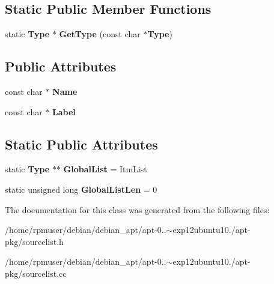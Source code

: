 \subsection*{\-Static \-Public \-Member \-Functions}
\begin{DoxyCompactItemize}
\item 
static {\bf \-Type} $\ast$ {\bfseries \-Get\-Type} (const char $\ast${\bf \-Type})\label{classpkgSourceList_1_1Type_a585f51a9eee88b69baeecffd95d4d71d}

\end{DoxyCompactItemize}
\subsection*{\-Public \-Attributes}
\begin{DoxyCompactItemize}
\item 
const char $\ast$ {\bfseries \-Name}\label{classpkgSourceList_1_1Type_a760b4e07b204e4852e7fb55e25567623}

\item 
const char $\ast$ {\bfseries \-Label}\label{classpkgSourceList_1_1Type_a2c28600dbc88e9535c6e44b111829cc2}

\end{DoxyCompactItemize}
\subsection*{\-Static \-Public \-Attributes}
\begin{DoxyCompactItemize}
\item 
static {\bf \-Type} $\ast$$\ast$ {\bfseries \-Global\-List} = \-Itm\-List\label{classpkgSourceList_1_1Type_a4f7b5b7cf66e2b414699eea2894719a9}

\item 
static unsigned long {\bfseries \-Global\-List\-Len} = 0\label{classpkgSourceList_1_1Type_acdd1750df964c2a94afe622abfe15d7b}

\end{DoxyCompactItemize}


\-The documentation for this class was generated from the following files\-:\begin{DoxyCompactItemize}
\item 
/home/rpmuser/debian/debian\-\_\-apt/apt-\/0..$\sim$exp12ubuntu10./apt-\/pkg/sourcelist.\-h\item 
/home/rpmuser/debian/debian\-\_\-apt/apt-\/0..$\sim$exp12ubuntu10./apt-\/pkg/sourcelist.\-cc\end{DoxyCompactItemize}
